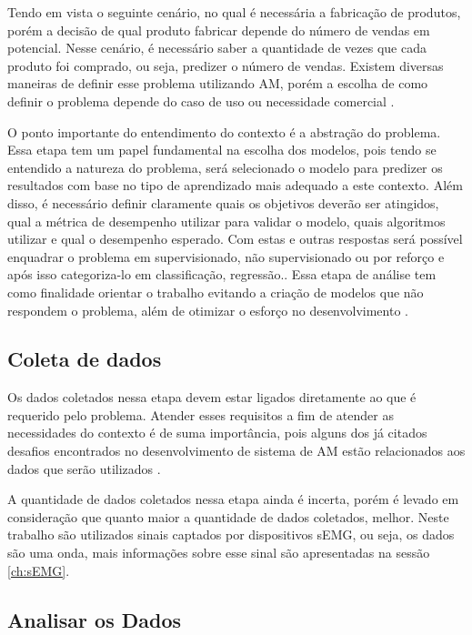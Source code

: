 Tendo em vista o seguinte cenário, no qual é necessária a fabricação de produtos, porém a decisão de qual produto fabricar depende do número de vendas em potencial. Nesse cenário, é necessário saber a quantidade de vezes que cada produto foi comprado, ou seja, predizer o número de vendas. Existem diversas maneiras de definir esse problema utilizando AM, porém a escolha de como definir o problema depende do caso de uso ou necessidade comercial \cite{Amazon}.

O ponto importante do entendimento do contexto é a abstração do problema. Essa etapa tem um papel fundamental na escolha dos modelos, pois tendo se entendido a natureza do problema, será selecionado o modelo para predizer os resultados com base no tipo de aprendizado mais adequado a este contexto. Além disso, é necessário definir claramente quais os objetivos deverão ser atingidos, qual a métrica de desempenho utilizar para validar o modelo, quais algoritmos utilizar e qual o desempenho esperado. Com estas e outras respostas será possível enquadrar o problema em supervisionado, não supervisionado ou por reforço e após isso categoriza-lo em classificação, regressão.\cite{geron2017hands}. Essa etapa de análise tem como finalidade orientar o trabalho evitando a criação de modelos que não respondem o problema, além de otimizar o esforço no desenvolvimento \cite{Amazon}.

\subsection{Coleta de dados}

Os dados coletados nessa etapa devem estar ligados diretamente ao que é requerido pelo problema. Atender esses requisitos a fim de atender as necessidades do contexto é de suma importância, pois alguns dos já citados desafios encontrados no desenvolvimento de sistema de AM estão relacionados aos dados que serão utilizados \cite{geron2017hands}.

A quantidade de dados coletados nessa etapa ainda é incerta, porém é levado em consideração que quanto maior a quantidade de dados coletados, melhor. Neste trabalho são utilizados sinais captados por dispositivos sEMG, ou seja, os dados são uma onda, mais informações sobre esse sinal são apresentadas na sessão \ref{ch:sEMG}.

\subsection{Analisar os Dados}

